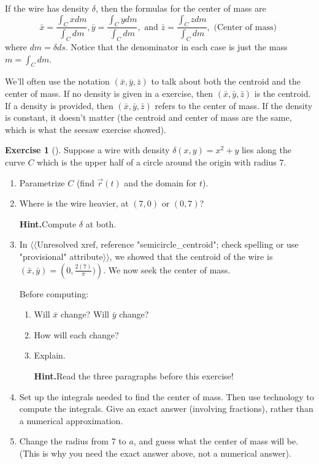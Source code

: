 \documentclass[10pt,]{book}
\theoremstyle{plain}
\theoremstyle{definition}
\theoremstyle{definition}
\theoremstyle{definition}
\theoremstyle{definition}
\newtheorem{exploration}[project]{Exercise}
\theoremstyle{definition}
\numberwithin{equation}{section}
\begin{document}
%
\par
If the wire has density \(\delta\), then the formulas for the center of mass are %
\begin{equation*}
\bar x = \frac{\int_C x dm}{\int_C  dm},
\bar y = \frac{\int_C y dm}{\int_C  dm}, 
\text{ and } 
\bar z = \frac{\int_C z dm}{\int_C  dm},  \text{ (Center of mass) }
\end{equation*}
where \(dm=\delta ds\). Notice that the denominator in each case is just the mass \(m=\int_C dm\).%
\par
We'll often use the notation \((\bar x, \bar y,\bar z)\) to talk about both the centroid and the center of mass. If no density is given in a exercise, then \((\bar x, \bar y,\bar z)\) is the centroid. If a density is provided, then \((\bar x, \bar y,\bar z)\) refers to the center of mass. If the density is constant, it doesn't matter (the centroid and center of mass are the same, which is what the seesaw exercise showed).%
\begin{exploration}[]\label{exploration-221}
Suppose a wire with density \(\delta(x,y)=x^2+y\) lies along the curve \(C\) which is the upper half of a circle around the origin with radius \(7\).%
\begin{enumerate}[font=\bfseries,label=(\alph*),ref=\alph*]
\item\label{task-582} Parametrize \(C\) (find \(\vec r(t)\) and the domain for \(t\)).%
\item\label{task-583} Where is the wire heavier, at \((7,0)\) or \((0,7)\)?%
\par\medskip\noindent%
\textbf{Hint.}\quad Compute \(\delta\) at both.%
\item\label{task-584} In {$\langle\langle$Unresolved xref, reference "semicircle\_centroid"; check spelling or use "provisional" attribute$\rangle\rangle$}, we showed that the centroid of the wire is \((\bar x, \bar y) = \left(0,\frac{2(7)}{\pi})\right)\). We now seek the center of mass.%
\par
Before computing:%
\begin{enumerate}[font=\bfseries,label=(\roman*),ref=\theenumi.\roman*]
\item\label{task-585} Will \(\bar x\) change? Will \(\bar y\) change?%
\item\label{task-586} How will each change?%
\item\label{task-587} Explain.%
\par\medskip\noindent%
\textbf{Hint.}\quad Read the three paragraphs before this exercise!%
\end{enumerate}
\item\label{task-588} Set up the integrals needed to find the center of mass. Then use technology to compute the integrals. Give an exact answer (involving fractions), rather than a numerical approximation.%
\item\label{task-589} Change the radius from 7 to \(a\), and guess what the center of mass will be.  (This is why you need the exact answer above, not a numerical answer).%
\end{enumerate}
\end{exploration}
\end{document}
